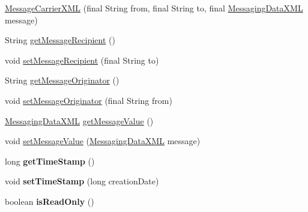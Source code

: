 \begin{DoxyCompactItemize}
\item 
\hyperlink{classgov_1_1fnal_1_1ppd_1_1dd_1_1xml_1_1MessageCarrierXML_afa8a6a3c8d64acc6995ee90573c876a4}{Message\-Carrier\-X\-M\-L} (final String from, final String to, final \hyperlink{classgov_1_1fnal_1_1ppd_1_1dd_1_1xml_1_1MessagingDataXML}{Messaging\-Data\-X\-M\-L} message)
\item 
String \hyperlink{classgov_1_1fnal_1_1ppd_1_1dd_1_1xml_1_1MessageCarrierXML_af46fdc989fa42e3371cb942a3394b945}{get\-Message\-Recipient} ()
\item 
void \hyperlink{classgov_1_1fnal_1_1ppd_1_1dd_1_1xml_1_1MessageCarrierXML_ad5cdc5a1a35c6d7af057292f4d5d92bd}{set\-Message\-Recipient} (final String to)
\item 
String \hyperlink{classgov_1_1fnal_1_1ppd_1_1dd_1_1xml_1_1MessageCarrierXML_a639740ab8bc6c5f1c45da4303dcbef74}{get\-Message\-Originator} ()
\item 
void \hyperlink{classgov_1_1fnal_1_1ppd_1_1dd_1_1xml_1_1MessageCarrierXML_ab74e97e9fb8c1776e318a76e5ed4123a}{set\-Message\-Originator} (final String from)
\item 
\hyperlink{classgov_1_1fnal_1_1ppd_1_1dd_1_1xml_1_1MessagingDataXML}{Messaging\-Data\-X\-M\-L} \hyperlink{classgov_1_1fnal_1_1ppd_1_1dd_1_1xml_1_1MessageCarrierXML_acd02da5d8151d98e634df355e0525d00}{get\-Message\-Value} ()
\item 
void \hyperlink{classgov_1_1fnal_1_1ppd_1_1dd_1_1xml_1_1MessageCarrierXML_afc625c4a225f08d1baf0774a1fbf6f3f}{set\-Message\-Value} (\hyperlink{classgov_1_1fnal_1_1ppd_1_1dd_1_1xml_1_1MessagingDataXML}{Messaging\-Data\-X\-M\-L} message)
\item 
\hypertarget{classgov_1_1fnal_1_1ppd_1_1dd_1_1xml_1_1MessageCarrierXML_afcee2a687bc16e7b95d60a91c223dd0b}{long {\bfseries get\-Time\-Stamp} ()}\label{classgov_1_1fnal_1_1ppd_1_1dd_1_1xml_1_1MessageCarrierXML_afcee2a687bc16e7b95d60a91c223dd0b}

\item 
\hypertarget{classgov_1_1fnal_1_1ppd_1_1dd_1_1xml_1_1MessageCarrierXML_a50d2114c07e7a2a365c31b73951cb588}{void {\bfseries set\-Time\-Stamp} (long creation\-Date)}\label{classgov_1_1fnal_1_1ppd_1_1dd_1_1xml_1_1MessageCarrierXML_a50d2114c07e7a2a365c31b73951cb588}

\item 
\hypertarget{classgov_1_1fnal_1_1ppd_1_1dd_1_1xml_1_1MessageCarrierXML_a9ab80285c3975daf5032897069ed0b80}{boolean {\bfseries is\-Read\-Only} ()}\label{classgov_1_1fnal_1_1ppd_1_1dd_1_1xml_1_1MessageCarrierXML_a9ab80285c3975daf5032897069ed0b80}


\end{DoxyCompactItemize}
